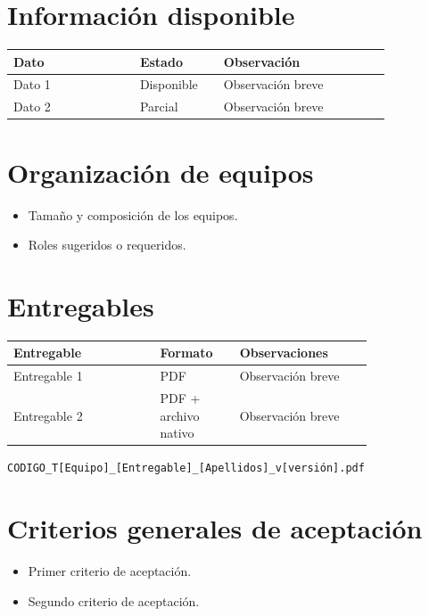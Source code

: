 \documentclass[11pt]{scrartcl}
\begin{document}
\section{Información disponible}

\begin{center}
\begin{tabular}{p{0.29\linewidth} p{0.18\linewidth} p{0.37\linewidth}}
  \toprule
  \textbf{Dato} & \textbf{Estado} & \textbf{Observación} \\
  \midrule
  Dato 1 & Disponible & Observación breve \\
  Dato 2 & Parcial     & Observación breve \\
  \bottomrule
\end{tabular}
\end{center}

\section{Organización de equipos}
\begin{itemize}
  \item Tamaño y composición de los equipos.
  \item Roles sugeridos o requeridos.
\end{itemize}

\section{Entregables}

\begin{center}
\begin{tabular}{p{0.33\linewidth} p{0.17\linewidth} p{0.30\linewidth}}
  \toprule
  \textbf{Entregable} & \textbf{Formato} & \textbf{Observaciones} \\
  \midrule
  Entregable 1 & PDF & Observación breve \\
  Entregable 2 & PDF + archivo nativo & Observación breve \\
  \bottomrule
\end{tabular}
\end{center}

\begin{icvnote}
\texttt{CODIGO\_T[Equipo]\_[Entregable]\_[Apellidos]\_v[versión].pdf}
\end{icvnote}

\section{Criterios generales de aceptación}
\begin{itemize}
  \item Primer criterio de aceptación.
  \item Segundo criterio de aceptación.
\end{itemize}
\end{document}
